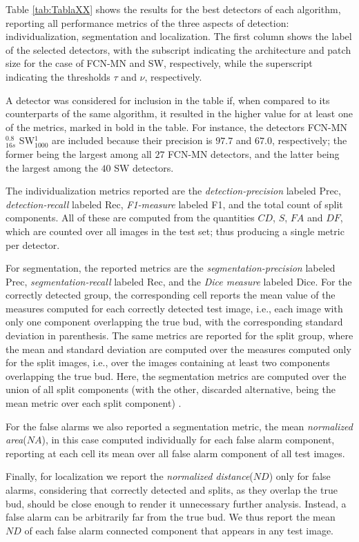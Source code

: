 \documentclass[a4paper,authoryear,review]{elsarticle}
\begin{document}
Table \ref{tab:TablaXX} shows the results for the best detectors of each algorithm, reporting all performance metrics of the three aspects of detection: individualization, segmentation and localization. The first column shows the label of the selected detectors, with the subscript indicating the architecture and patch size for the case of FCN-MN and SW, respectively, while the superscript indicating the thresholds $\tau$ and $\nu$, respectively.

A detector was considered for inclusion in the table if, when compared to its counterparts of the same algorithm, it resulted in the higher value for at least one of the metrics, marked in bold in the table. For instance, the detectors FCN-MN$_{16s}^{0.8}$ SW$_{1000}^1$ are included because their precision is $97.7$ and $67.0$, respectively; the former being the largest among all $27$ FCN-MN detectors, and the latter being the largest  among the $40$ SW detectors. 

The individualization metrics reported are the \emph{detection-precision} labeled Prec, \emph{detection-recall} labeled Rec, \emph{F1-measure} labeled F1, and the total count of split components. All of these are computed from the quantities $CD$, $S$, $FA$ and $DF$, which are counted over all images in the test set; thus producing a single metric per detector.

For segmentation, the reported metrics are the \emph{segmentation-precision} labeled Prec, \emph{segmentation-recall} labeled Rec, and the \emph{Dice measure} labeled Dice. For the correctly detected group, the corresponding cell reports the mean value of the measures computed for each correctly detected test image, i.e., each image with only one component overlapping the true bud, with the corresponding standard deviation  in parenthesis. The same metrics are reported for the split group, where the mean and standard deviation are computed over the measures computed only for the split images, i.e., over the images containing at least two components overlapping the true bud. Here, the segmentation metrics are computed over the union of all split components (with the other, discarded alternative, being the mean metric over each split component) . 

For the false alarms we also reported a segmentation metric, the mean \emph{normalized area}($NA$), in this case computed individually for each false alarm component, reporting at each cell its mean over all false alarm component of all test images. 

Finally, for localization we report the \emph{normalized distance}($ND$) only for false alarms, considering that correctly detected and splits, as they overlap the true bud, should be close enough to render it unnecessary further analysis. Instead, a false alarm can be arbitrarily far from the true bud.  We thus report the mean $ND$ of each false alarm connected component that appears in any test image.
\end{document}
